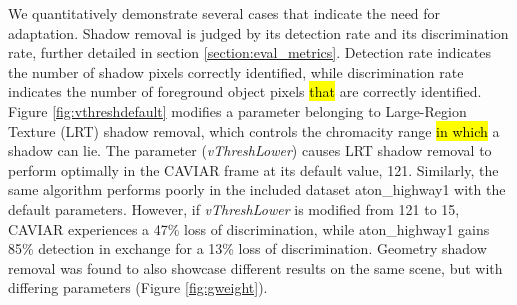 \documentclass[12pt]{report}
\begin{document}
We quantitatively demonstrate several cases that indicate the need for adaptation. Shadow removal is judged by its detection rate and its discrimination rate, further detailed in section \ref{section:eval_metrics}. Detection rate indicates the number of shadow pixels correctly identified, while discrimination rate indicates the number of foreground object pixels \hl{that} are correctly identified. Figure \ref{fig:vthreshdefault} modifies a parameter belonging to Large-Region Texture (LRT) shadow removal, which controls the chromacity range \hl{in which} a shadow can lie. The parameter (\textit{vThreshLower}) causes LRT shadow removal to perform optimally in the CAVIAR frame at its default value, 121. Similarly, the same algorithm performs poorly in the included dataset aton\_highway1 with the default parameters. However, if \textit{vThreshLower} is modified from 121 to 15, CAVIAR experiences a 47\% loss of discrimination, while aton\_highway1 gains 85\% detection in exchange for a 13\% loss of discrimination. Geometry shadow removal was found to also showcase different results on the same scene, but with differing parameters (Figure \ref{fig:gweight}). 

\end{document}
